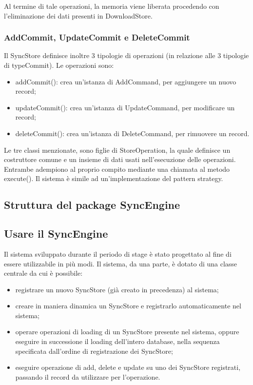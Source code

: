 \documentclass[10pt,a4paper,onecolumn]{article}
\begin{document}
Al termine di tale operazioni, la memoria viene liberata procedendo con l'eliminazione dei dati presenti in DownloadStore. 

\subsubsection{AddCommit, UpdateCommit e DeleteCommit}

Il SyncStore definisce inoltre 3 tipologie di operazioni (in relazione alle 3 tipologie di typeCommit). Le operazioni sono:
\begin{itemize}
	\item addCommit(): crea un'istanza di AddCommand, per aggiungere un nuovo record;
	\item updateCommit(): crea un'istanza di UpdateCommand, per modificare un record;
	\item deleteCommit(): crea un'istanza di DeleteCommand, per rimuovere un record.
\end{itemize}

Le tre classi menzionate, sono figlie di StoreOperation, la quale definisce un costruttore comune e un insieme di dati usati nell'esecuzione delle operazioni. Entrambe adempiono al proprio compito mediante una chiamata al metodo execute(). Il sistema è simile ad un'implementazione del pattern strategy.

\subsection{Struttura del package SyncEngine}

\label{sec:SyncEngine}
\subsection{Usare il SyncEngine}

Il sistema sviluppato durante il periodo di stage è stato progettato al fine di essere utilizzabile in più modi. Il sistema, da una parte, è dotato di una classe centrale da cui è possibile:
\begin{itemize}
	\item registrare un nuovo SyncStore (già creato in precedenza) al sistema;
	\item creare in maniera dinamica un SyncStore e registrarlo automaticamente nel sistema;
	\item operare operazioni di loading di un SyncStore presente nel sistema, oppure eseguire in successione il loading dell'intero database, nella sequenza specificata dall'ordine di registrazione dei SyncStore;
	\item eseguire operazione di add, delete e update su uno dei SyncStore registrati, passando il record da utilizzare per l'operazione.
\end{itemize}
\end{document}
